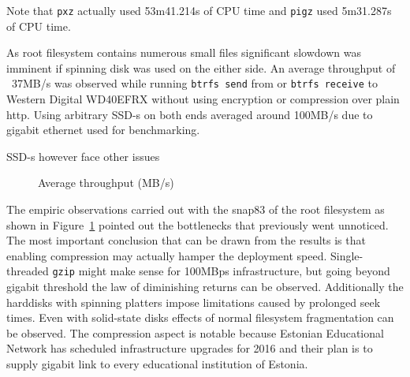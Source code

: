 \documentclass[a4paper,11pt]{kth-mag}
\begin{document}
Note that \lstinline!pxz! actually used 53m41.214s of CPU time
and \lstinline!pigz! used 5m31.287s of CPU time.

As root filesystem contains numerous small files significant
slowdown was imminent if spinning disk was used on the either side.
An average throughput of ~37MB/s was observed while
running \lstinline!btrfs send! from or \lstinline!btrfs receive! to
Western Digital WD40EFRX without using encryption or compression
over plain \acrshort{http}.
Using arbitrary SSD-s on both ends averaged around 100MB/s
due to gigabit ethernet used for benchmarking.

SSD-s however face other issues

\begin{figure}
\caption{Average throughput (MB/s)}
\label{fig:average-throughput}
\end{figure}

The empiric observations carried out with
the snap83 of the root filesystem as shown in Figure~\ref{fig:average-throughput} pointed out
the bottlenecks that previously went unnoticed.
The most important conclusion that can be drawn from the
results is that enabling compression may actually hamper the
deployment speed.
Single-threaded \lstinline!gzip! might make sense for 100MBps infrastructure,
but going beyond gigabit threshold the law of diminishing returns can be observed.
Additionally the harddisks with spinning platters
impose limitations caused by prolonged seek times.
Even with solid-state disks effects of normal filesystem fragmentation
can be observed.
The compression aspect is notable because
Estonian Educational Network has scheduled infrastructure
upgrades for 2016 and their plan is to supply
gigabit link to every educational institution of Estonia.
\end{document}
